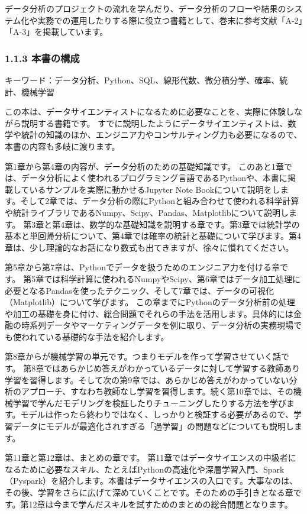 \documentclass[11pt]{article}
\begin{document}
    データ分析のプロジェクトの流れを学んだり、データ分析のフローや結果のシステム化や実務での運用したりする際に役立つ書籍として、巻末に参考文献「A-2」「A-3」を掲載しています。

    \subsubsection{1.1.3 本書の構成}\label{ux672cux66f8ux306eux69cbux6210}

キーワード：データ分析、Python、SQL、線形代数、微分積分学、確率、統計、機械学習

    この本は、データサイエンティストになるために必要なことを、実際に体験しながら説明する書籍です。
すでに説明したようにデータサイエンティストは、数学や統計の知識のほか、エンジニア力やコンサルティング力も必要になるので、本書の内容も多岐に渡ります。

第1章から第4章の内容が、データ分析のための基礎知識です。
このあと1章では、データ分析によく使われるプログラミング言語であるPythonや、本書に掲載しているサンプルを実際に動かせるJupyter
Note
Bookについて説明をします。そして2章では、データ分析の際にPythonと組み合わせて使われる科学計算や統計ライブラリであるNumpy、Scipy、Pandas、Matplotlibについて説明します。
第3章と第4章は、数学的な基礎知識を説明する章です。第3章では統計学の基本と単回帰分析について、第4章では確率の統計と基礎について学びます。第4章は、少し理論的なお話になり数式も出てきますが、徐々に慣れてください。

第5章から第7章は、Pythonでデータを扱うためのエンジニア力を付ける章です。
第5章では科学計算に使われるNumpyやScipy、第6章ではデータ加工処理に必要となるPandasを使ったテクニック、そして7章では、データの可視化（Matplotlib）について学びます。
この章までにPythonのデータ分析前の処理や加工の基礎を身に付け、総合問題でそれらの手法を活用します。具体的には金融の時系列データやマーケティングデータを例に取り、データ分析の実務現場でも使われている基礎的な手法を紹介します。

第8章からが機械学習の単元です。つまりモデルを作って学習させていく話です。
第8章ではあらかじめ答えがわかっているデータに対して学習する教師あり学習を習得します。そして次の第9章では、あらかじめ答えがわかっていない分析のアプローチ、すなわち教師なし学習を習得します。続く第10章では、その機械学習で学んだモデリングを検証したりチューニングしたりする方法を学びます。モデルは作ったら終わりではなく、しっかりと検証する必要があるので、学習データにモデルが最適化されすぎる「過学習」の問題などについても説明します。

第11章と第12章は、まとめの章です。
第11章ではデータサイエンスの中級者になるために必要なスキル、たとえばPythonの高速化や深層学習入門、Spark（Pyspark）を紹介します。本書はデータサイエンスの入口です。大事なのは、その後、学習をさらに広げて深めていくことです。そのための手引きとなる章です。第12章は今まで学んだスキルを試すためのまとめの総合問題となります。
\end{document}
